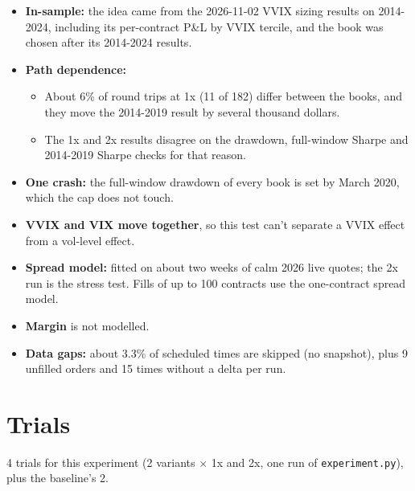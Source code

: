 \documentclass{article}
\begin{document}
\begin{itemize}

\item \textbf{In-sample:} the idea came from the 2026-11-02 VVIX sizing results on 2014-2024, including its per-contract P\&L by VVIX tercile, and the book was chosen after its 2014-2024 results.

\item \textbf{Path dependence:}

\begin{itemize}

\item About 6\% of round trips at 1x (11 of 182) differ between the books, and they move the 2014-2019 result by several thousand dollars.

\item The 1x and 2x results disagree on the drawdown, full-window Sharpe and 2014-2019 Sharpe checks for that reason.

\end{itemize}

\item \textbf{One crash:} the full-window drawdown of every book is set by March 2020, which the cap does not touch.

\item \textbf{VVIX and VIX move together}, so this test can't separate a VVIX effect from a vol-level effect.

\item \textbf{Spread model:} fitted on about two weeks of calm 2026 live quotes; the 2x run is the stress test. Fills of up to 100 contracts use the one-contract spread model.

\item \textbf{Margin} is not modelled.

\item \textbf{Data gaps:} about 3.3\% of scheduled times are skipped (no snapshot), plus 9 unfilled orders and 15 times without a delta per run.

\end{itemize}

\section{Trials}

4 trials for this experiment (2 variants \ensuremath{\times} 1x and 2x, one run of \texttt{experiment.\allowbreak{}py}), plus the baseline's 2.
\end{document}
